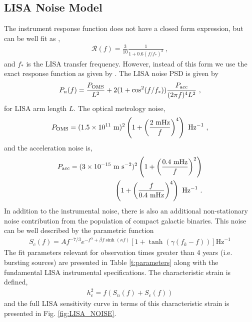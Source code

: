 \documentclass[a4paper,fleqn,usenatbib]{mnras}
\begin{document}
\subsection{LISA Noise Model}
\label{sec:LISAnoise}
The instrument response function does not have a closed form expression, but can be well fit as \citep{Robson2019},
\begin{eqnarray}
\mathcal{R}(f) = \frac{3}{10} \frac{1}{1+0.6(f/f_*)^2} \ ,
\end{eqnarray}
and $f_*$ is the LISA transfer frequency. However, instead of this form we use the exact response function as given by \cite{RobsonGIT2018}. The LISA noise PSD is given by
\begin{eqnarray}
P_n(f) = \frac{P_{\rm OMS}}{L^2} + 2(1+\cos^2(f/f_*)) \frac{P_{\rm acc}}{(2\pi f)^4 L^2} \ ,
\end{eqnarray}
for LISA arm length $L $. The  optical metrology noise,
\begin{eqnarray}
P_{\rm OMS} = (1.5 \times 10^{11} \text{ m})^2 \left(1 + \left(\frac{2 \text{ mHz}}{f}\right)^4\right) \text{ Hz}^{-1} \ ,
\end{eqnarray}
and the acceleration noise is,
\begin{align}
P_{\rm acc} = (3 \times 10^{-15} \text{ m s}^{-2})^2 \left(1 + \left(\frac{0.4 \text{ mHz}}{f}\right)^2\right) \nonumber \\ 
\left(1 + \left(\frac{f}{0.4 \text{ mHz}}\right)^4\right) \text{ Hz}^{-1} \ .
\end{align}
In addition to the instrumental noise, there is also an additional non-stationary noise contribution from the population of compact galactic binaries. This noise can be well described by the parametric function \citep{Cornish2017}
\begin{align}
S_c(f) = A f^{-7/3} e^{-f^{\alpha} + \beta f \sinh(\kappa f)} \left[ 1 + \tanh (\gamma (f_k - f))\right] \text{Hz} ^{-1}
\end{align}
The fit parameters relevant for observation times greater than 4 years (i.e. bursting sources)  are presented in Table \ref{t:parameters} along with the fundamental LISA instrumental specifications. The characteristic strain is defined,
\begin{eqnarray}
h_c^2 = f(S_n(f) + S_c(f)) 
\label{eq:strain}
\end{eqnarray}
and the full LISA sensitivity curve in terms of this characteristic strain is presented in Fig. \ref{fig:LISA_NOISE}.
\end{document}

